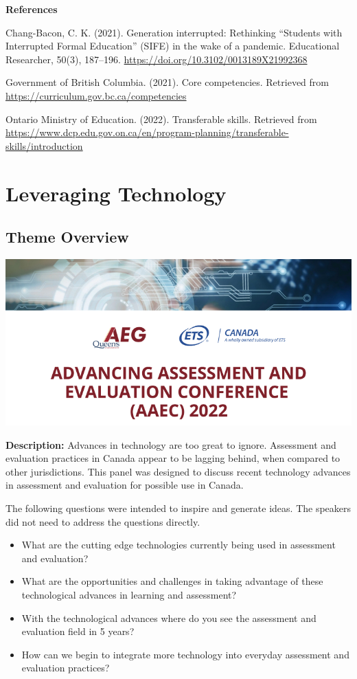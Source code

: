 \documentclass[
]{book}
\begin{document}
\textbf{References}

Chang-Bacon, C. K. (2021). Generation interrupted: Rethinking ``Students with Interrupted Formal Education'' (SIFE) in the wake of a pandemic. Educational Researcher, 50(3), 187--196. \url{https://doi.org/10.3102/0013189X21992368}

Government of British Columbia. (2021). Core competencies. Retrieved from \url{https://curriculum.gov.bc.ca/competencies}

Ontario Ministry of Education. (2022). Transferable skills. Retrieved from \url{https://www.dcp.edu.gov.on.ca/en/program-planning/transferable-skills/introduction}

\newpage

\hypertarget{theme2}{%
\chapter{Leveraging Technology}\label{theme2}}

\hypertarget{theme-overview-1}{%
\section{Theme Overview}\label{theme-overview-1}}

\includegraphics{Content/H.png}

\textbf{Description:} Advances in technology are too great to ignore. Assessment and evaluation practices in Canada appear to be lagging behind, when compared to other jurisdictions. This panel was designed to discuss recent technology advances in assessment and evaluation for possible use in Canada.

The following questions were intended to inspire and generate ideas. The speakers did not need to address the questions directly.

\begin{itemize}
\item
  What are the cutting edge technologies currently being used in assessment and evaluation?
\item
  What are the opportunities and challenges in taking advantage of these technological advances in learning and assessment?
\item
  With the technological advances where do you see the assessment and evaluation field in 5 years?
\item
  How can we begin to integrate more technology into everyday assessment and evaluation practices?
\end{itemize}
\end{document}
